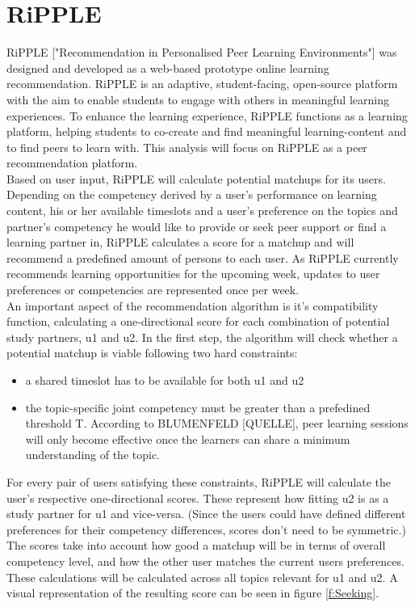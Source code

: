 \documentclass[nochapterpage,bigchapter,linedtoc,longdoc,colorback,accentcolor=tud3b]{tudreport}
\begin{document}
\section{RiPPLE}
RiPPLE ["Recommendation in Personalised Peer Learning Environments"] was designed and developed as a web-based prototype online learning recommendation. RiPPLE is an adaptive, student-facing, open-source platform with the aim to enable students to engage with others in meaningful learning experiences. To enhance the learning experience, RiPPLE functions as a learning platform, helping students to co-create and find meaningful learning-content and to find peers to learn with. This analysis will focus on RiPPLE as a peer recommendation platform.\\
Based on user input, RiPPLE will calculate potential matchups for its users. Depending on the competency derived by a user's performance on learning content, his or her available timeslots and a user's preference on the topics and partner's competency he would like to provide or seek peer support or find a learning partner in, RiPPLE calculates a score for a matchup and will recommend a predefined amount of persons to each user. As RiPPLE currently recommends learning opportunities for the upcoming week, updates to user preferences or competencies are represented once per week.\\
An important aspect of the recommendation algorithm is it's compatibility function, calculating a one-directional score for each combination of potential study partners, u1 and u2. In the first step, the algorithm will check whether a potential matchup is viable following two hard constraints:
\begin{itemize}
	\item a shared timeslot has to be available for both u1 and u2
	\item the topic-specific joint competency must be greater than a prefedined threshold T. According to BLUMENFELD [QUELLE], peer learning sessions will only become effective once the learners can share a minimum understanding of the topic.
\end{itemize}
For every pair of users satisfying these constraints, RiPPLE will calculate the user's respective one-directional scores. These represent how fitting u2 is as a study partner for u1 and vice-versa. (Since the users could have defined different preferences for their competency differences, scores don't need to be symmetric.) The scores take into account how good a matchup will be in terms of overall competency level, and how the other user matches the current users preferences. These calculations will be calculated across all topics relevant for u1 and u2. A visual representation of the resulting score can be seen in figure \ref{f:Seeking}.\\
\end{document}
